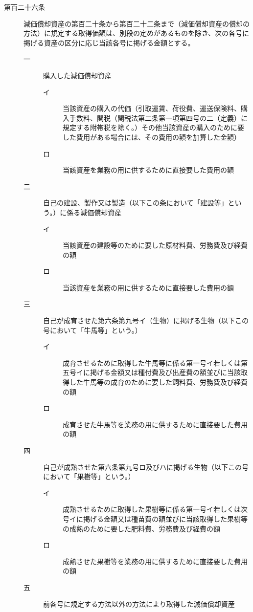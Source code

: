 \documentclass[twocolumn,a4j,10pt]{ltjtarticle}
\begin{document}
\begin{description}
\item[第百二十六条]減価償却資産の第百二十条から第百二十二条まで（減価償却資産の償却の方法）に規定する取得価額は、別段の定めがあるものを除き、次の各号に掲げる資産の区分に応じ当該各号に掲げる金額とする。
\begin{description}
\item[一]購入した減価償却資産
\begin{description}
\item[イ]当該資産の購入の代価（引取運賃、荷役費、運送保険料、購入手数料、関税（関税法第二条第一項第四号の二（定義）に規定する附帯税を除く。）その他当該資産の購入のために要した費用がある場合には、その費用の額を加算した金額）
\item[ロ]当該資産を業務の用に供するために直接要した費用の額
\end{description}
\item[二]自己の建設、製作又は製造（以下この条において「建設等」という。）に係る減価償却資産
\begin{description}
\item[イ]当該資産の建設等のために要した原材料費、労務費及び経費の額
\item[ロ]当該資産を業務の用に供するために直接要した費用の額
\end{description}
\item[三]自己が成育させた第六条第九号イ（生物）に掲げる生物（以下この号において「牛馬等」という。）
\begin{description}
\item[イ]成育させるために取得した牛馬等に係る第一号イ若しくは第五号イに掲げる金額又は種付費及び出産費の額並びに当該取得した牛馬等の成育のために要した飼料費、労務費及び経費の額
\item[ロ]成育させた牛馬等を業務の用に供するために直接要した費用の額
\end{description}
\item[四]自己が成熟させた第六条第九号ロ及びハに掲げる生物（以下この号において「果樹等」という。）
\begin{description}
\item[イ]成熟させるために取得した果樹等に係る第一号イ若しくは次号イに掲げる金額又は種苗費の額並びに当該取得した果樹等の成熟のために要した肥料費、労務費及び経費の額
\item[ロ]成熟させた果樹等を業務の用に供するために直接要した費用の額
\end{description}
\item[五]前各号に規定する方法以外の方法により取得した減価償却資産

\end{description}
\end{description}
\end{document}
